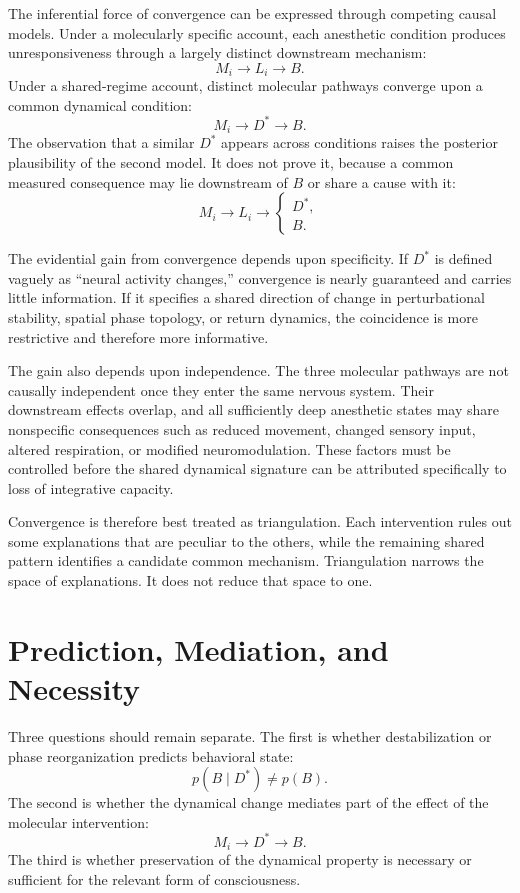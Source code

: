 \documentclass[11pt]{book}
\begin{document}
The inferential force of convergence can be expressed through competing causal models. Under a molecularly specific account, each anesthetic condition produces unresponsiveness through a largely distinct downstream mechanism:
\[
M_i\longrightarrow L_i\longrightarrow B.
\]
Under a shared-regime account, distinct molecular pathways converge upon a common dynamical condition:
\[
M_i\longrightarrow D^{*}\longrightarrow B.
\]
The observation that a similar $D^{*}$ appears across conditions raises the posterior plausibility of the second model. It does not prove it, because a common measured consequence may lie downstream of $B$ or share a cause with it:
\[
M_i\longrightarrow L_i
\longrightarrow
\begin{cases}
D^{*},\\
B.
\end{cases}
\]

The evidential gain from convergence depends upon specificity. If $D^{*}$ is defined vaguely as ``neural activity changes,'' convergence is nearly guaranteed and carries little information. If it specifies a shared direction of change in perturbational stability, spatial phase topology, or return dynamics, the coincidence is more restrictive and therefore more informative.

The gain also depends upon independence. The three molecular pathways are not causally independent once they enter the same nervous system. Their downstream effects overlap, and all sufficiently deep anesthetic states may share nonspecific consequences such as reduced movement, changed sensory input, altered respiration, or modified neuromodulation. These factors must be controlled before the shared dynamical signature can be attributed specifically to loss of integrative capacity.

Convergence is therefore best treated as triangulation. Each intervention rules out some explanations that are peculiar to the others, while the remaining shared pattern identifies a candidate common mechanism. Triangulation narrows the space of explanations. It does not reduce that space to one.

\section*{Prediction, Mediation, and Necessity}

Three questions should remain separate. The first is whether destabilization or phase reorganization predicts behavioral state:
\[
p(B\mid D^{*})\neq p(B).
\]
The second is whether the dynamical change mediates part of the effect of the molecular intervention:
\[
M_i\longrightarrow D^{*}\longrightarrow B.
\]
The third is whether preservation of the dynamical property is necessary or sufficient for the relevant form of consciousness.
\end{document}
